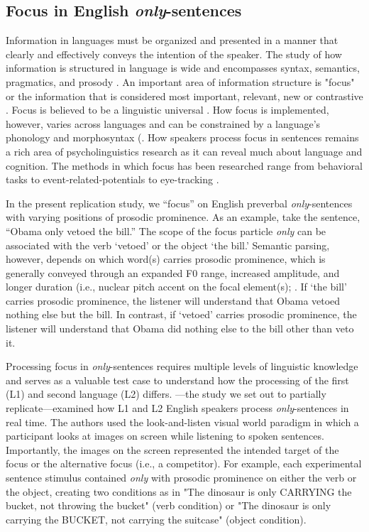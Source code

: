 \subsection{Focus in English \textit{only}-sentences}

Information in languages must be organized and presented in a manner that clearly and effectively conveys the intention of the speaker. The study of how information is structured in language is wide and encompasses syntax, semantics, pragmatics, and prosody \citep[see ][] {Breen2010, Lambrecht1994, Roberts2012}. An important area of information structure is "focus" or the information that is considered most important, relevant, new or contrastive \citep{Kiss1998}. Focus is believed to be a linguistic universal \citep{Comrie1989}. How focus is implemented, however, varies across languages and can be constrained by a language’s phonology and morphosyntax (\citep{Kiss1998, Lambrecht1994}. How speakers process focus in sentences remains a rich area of psycholinguistics research as it can reveal much about language and cognition. The methods in which focus has been researched range from behavioral tasks \citep[e.g.,][] {Cutler1979, Paterson1999} to event-related-potentials \citep[e.g.,][] {Chen2014, Wang2011} to eye-tracking \citep[e.g.,][] {Filik2005, Hohle2016}.

In the present replication study, we “focus” on English preverbal \textit{only}-sentences with varying positions of prosodic prominence. As an example, take the sentence, “Obama only vetoed the bill.” The scope of the focus particle \textit{only} can be associated with the verb ‘vetoed’ or the object ‘the bill.’ Semantic parsing, however, depends on which word(s) carries prosodic prominence, which is generally conveyed through an expanded F0 range, increased amplitude, and longer duration (i.e., nuclear pitch accent on the focal element(s); \citep{Breen2010, Gussenhoven1983}.  If ‘the bill’ carries prosodic prominence, the listener will understand that Obama vetoed nothing else but the bill. In contrast, if ‘vetoed’ carries prosodic prominence, the listener will understand that Obama did nothing else to the bill other than veto it. 

Processing focus in \textit{only}-sentences requires multiple levels of linguistic knowledge and serves as a valuable test case to understand how the processing of the first (L1) and second language (L2) differs. \cite{Ge2021}---the study we set out to partially replicate---examined how L1 and L2 English speakers process \textit{only}-sentences in real time. The authors used the look-and-listen visual world paradigm in which a participant looks at images on screen while listening to spoken sentences. Importantly, the images on the screen represented the intended target of the focus or the alternative focus (i.e., a competitor). For example, each experimental sentence stimulus contained \textit{only} with prosodic prominence on either the verb or the object, creating two conditions as in "The dinosaur is only CARRYING the bucket, not throwing the bucket" (verb condition) or "The dinosaur is only carrying the BUCKET, not carrying the suitcase" (object condition).

